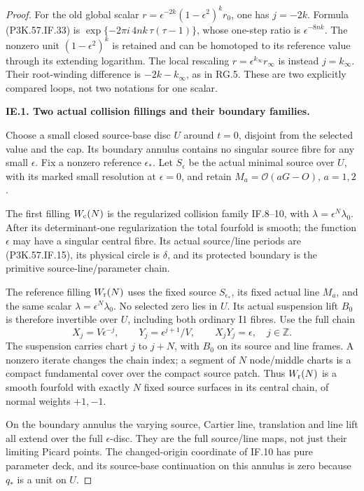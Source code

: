 \begin{proof}
For the old global scalar
\(r=\epsilon^{-2k}(1-\epsilon^2)^kr_0\),
one has \(j=-2k\). Formula (P3K.57.IF.33) is
\(\exp\{-2\pi i\,4nk\,\tau(\tau-1)\}\),
whose one-step ratio is
\(\epsilon^{-8nk}\). The nonzero unit
\((1-\epsilon^2)^k\) is retained and
can be homotoped to its reference value
through its extending logarithm.
The local rescaling
\(r=\epsilon^{k_\infty}r_\infty\)
is instead \(j=k_\infty\). Their
root-winding difference is
\(-2k-k_\infty\), as in RG.5.
These are two explicitly compared
loops, not two notations for one scalar.


\par\medskip\noindent\textbf{IE.1. Two actual collision fillings and their boundary families.}\par\nopagebreak[4]

Choose a small closed source-base disc \(U\) around \(t=0\), disjoint
from the selected value and the cap. Its boundary annulus contains no
singular source fibre for any small \(\epsilon\). Fix a nonzero
reference \(\epsilon_*\). Let \(S_\epsilon\) be the actual minimal
source over \(U\), with its marked small resolution at \(\epsilon=0\),
and retain \(M_a=\mathcal O(aG-O)\), \(a=1,2\).

The first filling \(W_{\rm c}(N)\) is the regularized collision family
IF.8--10, with \(\lambda=\epsilon^N\lambda_0\). After its
determinant-one regularization the total fourfold is smooth; the
function \(\epsilon\) may have a singular central fibre. Its actual
source/line periods are (P3K.57.IF.15), its physical circle is \(\delta\),
and its protected boundary is the primitive source-line/parameter
chain.

The reference filling \(W_{\rm r}(N)\) uses the fixed source
\(S_{\epsilon_*}\), its fixed actual line \(M_a\), and the same scalar
\(\lambda=\epsilon^N\lambda_0\). No selected zero lies in \(U\).
Its actual suspension lift \(B_0\) is therefore invertible over
\(U\), including both ordinary I1 fibres. Use the full chain
\[
 X_j=V\epsilon^{-j},\qquad
 Y_j=\epsilon^{j+1}/V,\qquad X_jY_j=\epsilon ,
 \quad j\in\mathbb Z.                                  \tag{P3K.57.IE.1}
\]
The suspension carries chart \(j\) to \(j+N\), with \(B_0\) on
its source and line frames. A nonzero iterate changes the chain
index; a segment of \(N\) node/middle charts is a compact
fundamental cover over the compact source patch. Thus
\(W_{\rm r}(N)\) is a smooth fourfold with exactly \(N\) fixed
source surfaces in its central chain, of normal weights \(+1,-1\).

On the boundary annulus the varying source, Cartier line,
translation and line lift all extend over the full
\(\epsilon\)-disc. They are the full source/line maps, not just
their limiting Picard points. The changed-origin coordinate
of IF.10 has pure parameter deck, and its source-base
continuation on this annulus is zero because \(q_*\) is a unit
on \(U\).


\end{proof}
